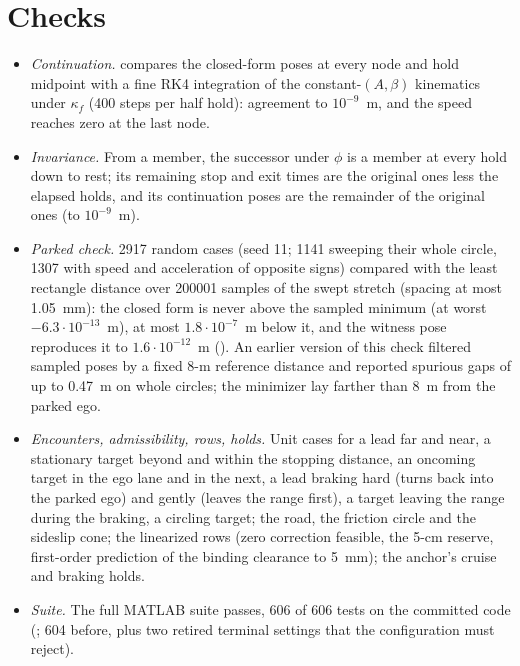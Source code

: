 \documentclass[11pt]{article}
\begin{document}
\section{Checks}
\begin{itemize}
\item \emph{Continuation.}  compares the closed-form
poses at every node and hold midpoint with a fine RK4 integration of the
constant-$(A,\beta)$ kinematics under $\kappa_f$ (400 steps per half hold):
agreement to $10^{-9}$~m, and the speed reaches zero at the last node.
\item \emph{Invariance.} From a member, the successor under $\phi$ is a
member at every hold down to rest; its remaining stop and exit times are the
original ones less the elapsed holds, and its continuation poses are the
remainder of the original ones (to $10^{-9}$~m).
\item \emph{Parked check.} 2917 random cases (seed 11; 1141 sweeping their
whole circle, 1307 with speed and acceleration of opposite signs) compared
with the least rectangle distance over 200001 samples of the swept stretch
(spacing at most 1.05~mm): the closed form is never above the sampled minimum
(at worst $-6.3\cdot10^{-13}$~m), at most $1.8\cdot10^{-7}$~m below it, and the
witness pose reproduces it to $1.6\cdot10^{-12}$~m
(). An earlier version of this check
filtered sampled poses by a fixed 8-m reference distance and reported
spurious gaps of up to 0.47~m on whole circles; the minimizer lay farther
than 8~m from the parked ego.
\item \emph{Encounters, admissibility, rows, holds.} Unit cases for a lead
far and near, a stationary target beyond and within the stopping distance,
an oncoming target in the ego lane and in the next, a lead braking hard
(turns back into the parked ego) and gently (leaves the range first), a
target leaving the range during the braking, a circling target; the road,
the friction circle and the sideslip cone; the linearized rows (zero
correction feasible, the 5-cm reserve, first-order prediction of the binding
clearance to 5~mm); the anchor's cruise and braking holds.
\item \emph{Suite.} The full MATLAB suite passes, 606 of 606 tests on the committed code (; 604 before, plus two retired terminal settings that the configuration must reject).
\end{itemize}
\end{document}
